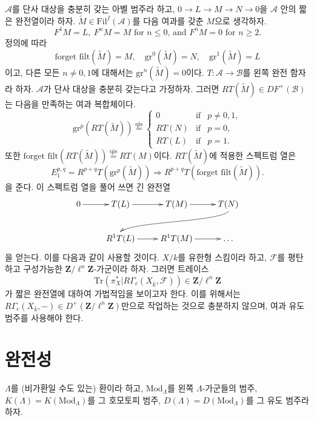 \noindent
$\mathcal{A}$를 단사 대상을 충분히 갖는 아벨 범주라 하고,
$0 \to L \to M \to N \to 0$을 $\mathcal{A}$ 안의 짧은 완전열이라 하자.
$\widetilde M \in \text{Fil}^f(\mathcal{A})$를 다음 여과를 갖춘 $M$으로
생각하자.
$$
F^1M = L, \ F^nM = M
\text{ for }n \leq 0\text{, and }F^nM = 0\text{ for }n \geq 2.
$$
정의에 따라
$$
\text{forget filt}(\widetilde M) = M, \quad
\text{gr}^0(\widetilde M) = N, \quad
\text{gr}^1(\widetilde M) = L
$$
이고, 다른 모든 $n \neq 0, 1$에 대해서는
$\text{gr}^n(\widetilde M) = 0$이다. $T: \mathcal{A} \to \mathcal{B}$를
왼쪽 완전 함자라 하자. $\mathcal{A}$가 단사 대상을 충분히 갖는다고
가정하자. 그러면 $RT(\widetilde M) \in DF^+(\mathcal{B})$는 다음을
만족하는 여과 복합체이다.
$$
\text{gr}^p(RT(\widetilde M))
\stackrel{\text{qis}}{=}
\left\{
\begin{matrix}
0 & \text{if} & p \neq 0, 1, \\
RT(N) & \text{if} & p = 0, \\
RT(L) & \text{if} & p = 1.
\end{matrix}
\right.
$$
또한
$\text{forget filt}(RT(\widetilde M))\stackrel{\text{qis}}{ = } RT(M)$이다.
$RT(\widetilde M)$에 적용한 스펙트럼 열은
$$
E_1^{p, q} = R^{p+q}T(\text{gr}^p(\widetilde M)) \Rightarrow
R^{p+q}T(\text{forget filt}(\widetilde M)).
$$
을 준다. 이 스펙트럼 열을 풀어 쓰면 긴 완전열
$$
\xymatrix{
0 \ar[r] & T(L) \ar[r] & T(M) \ar[r] & T(N) \ar@(rd, ul)[rdllllr] \\
& R^1T(L) \ar[r] & R^1T(M) \ar[r] & \ldots
}
$$
을 얻는다. 이를 다음과 같이 사용할 것이다. $X/k$를 유한형 스킴이라
하고, $\mathcal{F}$를 평탄하고 구성가능한
$\mathbf{Z}/\ell^n \mathbf{Z}$-가군이라 하자. 그러면 트레이스
$$
\text{Tr}( \pi_X^\ast | R\Gamma_c(X_{\bar k}, \mathcal{F})) \in
\mathbf{Z}/\ell^n \mathbf{Z}
$$
가 짧은 완전열에 대하여 가법적임을 보이고자 한다. 이를 위해서는
$R\Gamma_c(X_{\bar k}, -) \in D^+(\mathbf{Z}/\ell^n \mathbf{Z})$만으로
작업하는 것으로 충분하지 않으며, 여과 유도 범주를 사용해야 한다.







\section{완전성}
\label{section-perfect}

\noindent
$\Lambda$를 (비가환일 수도 있는) 환이라 하고,
$\text{Mod}_{\Lambda}$를 왼쪽 $\Lambda$-가군들의 범주,
$K(\Lambda) = K(\text{Mod}_\Lambda)$를 그 호모토피 범주,
$D(\Lambda)= D(\text{Mod}_\Lambda)$를 그 유도 범주라 하자.

